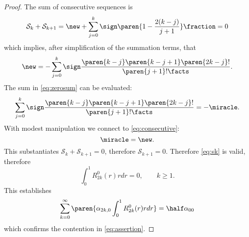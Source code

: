 \begin{proof}
The sum of consecutive sequences is
  \begin{equation}
    \mathcal{S}_{k} + \mathcal{S}_{k+1} = 
    \new +
    \sum_{j=0}^{k} \sign \paren{1-\frac{2(k-j)} {j+1}} \fraction 
    = 0
  \label{eq:consecutive}
  \end{equation}
which implies, after simplification of the summation terms, that
  \begin{equation}
    \new =
    -\sum_{j=0}^{k} \sign \frac{\paren{k-j} \paren{k-j+1} \paren{2k-j}!} {\paren{j+1}!\facts} .
  \label{eq:zerosum}
  \end{equation}
The sum in \eqref{eq:zerosum} can be evaluated:
  \begin{equation}
     \sum_{j=0}^{k} \sign \frac{\paren{k-j} \paren{k-j+1} \paren{2k-j}!} {\paren{j+1}!\facts}  = -\miracle.
  \end{equation}
With modest manipulation we connect to \eqref{eq:consecutive}:
  \begin{equation}
    \miracle =
    \new.
  \end{equation}
This substantiates $\mathcal{S}_{k} + \mathcal{S}_{k+1} = 0$, therefore $\mathcal{S}_{k+1} = 0$. Therefore \eqref{eq:sk} is valid, therefore
  \begin{equation}
    \int_{0}^{1} R_{2k}^{0}(r)rdr = 0, \qquad k \ge 1.
  \end{equation}
This establishes
  \begin{equation}
    \sum_{k=0}^{\infty} \paren{\alpha_{2k,0} \int_{0}^{1} R_{2k}^{0}(r)rdr} = \half \alpha_{00}
  \end{equation}
which confirms the contention in \eqref{eq:assertion}.
\end{proof}

\endinput %